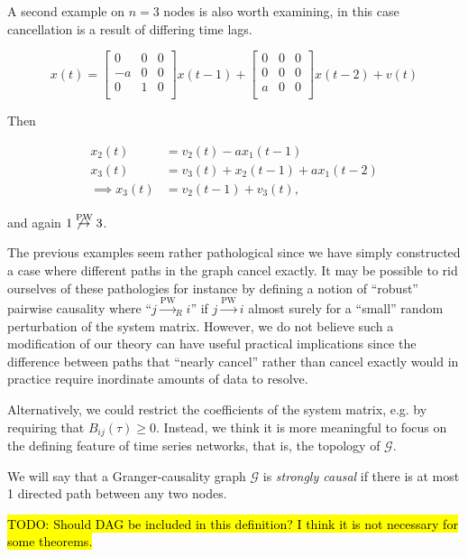 \documentclass[12pt]{article}
\def\pwgc{\overset{\text{PW}}{\rightarrow}}  %
\def\gcg{\mathcal{G}}  %
\begin{document}
\begin{example}
  \label{ex:lag_cancellation}
  A second example on $n = 3$ nodes is also worth examining, in this case
  cancellation is a result of differing time lags.

\begin{equation*}
  x(t) =
  \left[
    \begin{array}{ccc}
      0 & 0 & 0\\
      -a & 0 & 0\\
      0 & 1 & 0\\
    \end{array}
  \right] x(t - 1) +
  \left[
    \begin{array}{ccc}
      0 & 0 & 0\\
      0 & 0 & 0\\
      a & 0 & 0\\
    \end{array}
  \right] x(t - 2) + v(t)
\end{equation*}

Then

\begin{align*}
  x_2(t) &= v_2(t) - ax_1(t - 1)\\
  x_3(t) &= v_3(t) + x_2(t - 1) + ax_1(t - 2)\\
  \implies x_3(t) &= v_2(t - 1) + v_3(t),
\end{align*}

and again $1 \not\pwgc 3$.
\end{example}

The previous examples seem rather pathological since we have simply
constructed a case where different paths in the graph cancel exactly.
It may be possible to rid ourselves of these pathologies for instance
by defining a notion of ``robust'' pairwise causality where
``$j \pwgc _R i$'' if $j \pwgc i$ almost surely for a ``small'' random
perturbation of the system matrix.  However, we do not believe such a
modification of our theory can have useful practical implications
since the difference between paths that ``nearly cancel'' rather than
cancel exactly would in practice require inordinate amounts of data to
resolve.

Alternatively, we could restrict the coefficients of the system
matrix, e.g. by requiring that $B_{ij}(\tau) \ge 0$.  Instead, we
think it is more meaningful to focus on the defining feature of time
series networks, that is, the topology of $\gcg$.

\begin{definition}
  We will say that a Granger-causality graph $\gcg$ is \textit{strongly causal}
if there is at most 1 directed path between any two nodes.

\hl{TODO: Should DAG be included in this definition?  I think it is
  not necessary for some theorems.}
\end{definition}
\end{document}
